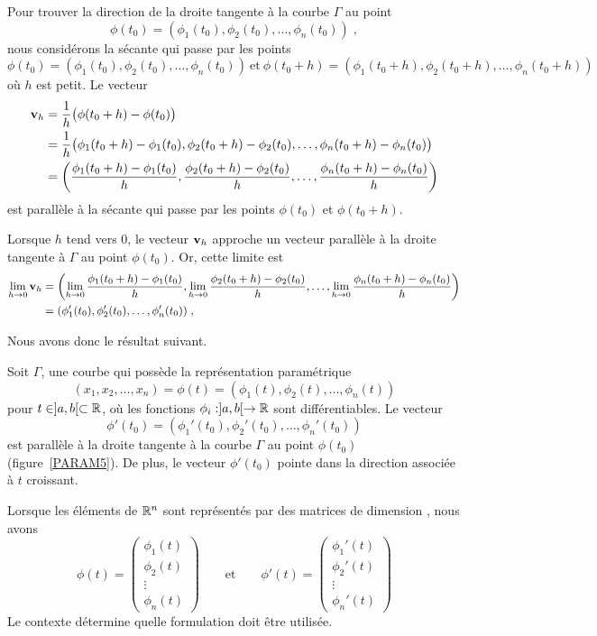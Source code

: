 {Pour trouver la direction de la droite tangente à la courbe $\Gamma$
au point
\[
\phi(t_0) = (\phi_1(t_0), \phi_2(t_0), \ldots, \phi_n(t_0)) \; ,
\]
nous considérons la sécante qui passe par les points
\[
\phi(t_0) = (\phi_1(t_0), \phi_2(t_0), \ldots, \phi_n(t_0))
\ \text{et} \ 
\phi(t_0+h) = (\phi_1(t_0+h), \phi_2(t_0+h), \ldots, \phi_n(t_0+h))
\]
où $h$ est petit. Le vecteur
\begin{align*}
\mathbf{v}_h &= \frac{1}{h} \big(\phi(t_0+h)-\phi(t_0)\big) \\
&= \frac{1}{h}\big(\phi_1(t_0+h) - \phi_1(t_0),
\phi_2(t_0+h) - \phi_2(t_0), \ldots , \phi_n(t_0+h)-\phi_n(t_0)\big) \\
&= \left(\displaystyle \frac{\phi_1(t_0+h) - \phi_1(t_0)}{h},
\displaystyle \frac{\phi_2(t_0+h) - \phi_2(t_0)}{h}, \ldots ,
\displaystyle \frac{\phi_n(t_0+h) - \phi_n(t_0)}{h}\right)
\end{align*}
est parallèle à la sécante qui passe par les points $\phi(t_0)$ et
$\phi(t_0+h)$.

Lorsque $h$ tend vers $0$, le vecteur $\mathbf{v}_h$ approche un vecteur
parallèle à la droite tangente à $\Gamma$ au point $\phi(t_0)$.  Or,
cette limite est
\begin{align*}
\lim_{h\rightarrow 0}\mathbf{v}_h &=
\left(\displaystyle \lim_{h\rightarrow 0}\frac{\phi_1(t_0+h) - \phi_1(t_0)}{h},
\displaystyle \lim_{h\rightarrow 0}\frac{\phi_2(t_0+h) - \phi_2(t_0)}{h},
 \ldots ,
\displaystyle \lim_{h\rightarrow 0}\frac{\phi_n(t_0+h)
- \phi_n(t_0)}{h}\right) \\
&= (\phi_1'(t_0), \phi_2'(t_0), \ldots, \phi_n'(t_0)) \; ,
\end{align*}

Nous avons donc le résultat suivant.

\begin{focus}{\prp}
Soit $\Gamma$, une courbe qui possède la représentation paramétrique
\[
(x_1,x_2, \ldots, x_n) =
\phi(t) = (\phi_1(t), \phi_2(t), \ldots, \phi_n(t))
\]
pour $t \in ]a,b[ \subset \mathbb{R}$, où les fonctions
$\phi_i:]a,b[ \rightarrow \mathbb{R}$ sont différentiables.
Le vecteur
\[
\phi'(t_0) = (\phi_1'(t_0), \phi_2'(t_0), \ldots, \phi_n'(t_0))
\]
est parallèle à la droite tangente à la courbe $\Gamma$ au point
$\phi(t_0)$ (figure~\ref{PARAM5}).  De plus, le vecteur $\phi'(t_0)$
pointe dans la direction associée à $t$ croissant.

Lorsque les éléments de $\mathbb{R}^n$ sont représentés par des matrices de
dimension \nm{n}{1}, nous avons
\[
\phi(t) = \begin{pmatrix}
  \phi_1(t) \\ \phi_2(t) \\ \vdots \\ \phi_n(t)
\end{pmatrix}
\qquad \text{et} \qquad
\phi'(t) = \begin{pmatrix}
  \phi_1'(t) \\ \phi_2'(t) \\ \vdots \\ \phi_n'(t)
\end{pmatrix}
\]
Le contexte détermine quelle formulation doit être utilisée.
\end{focus}

}
